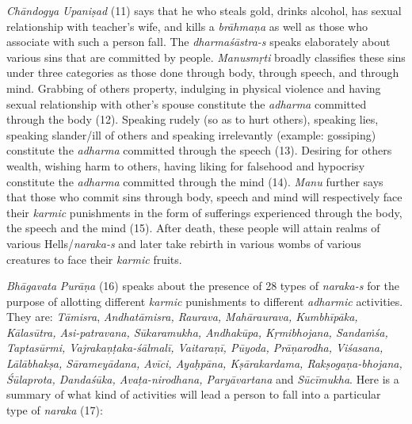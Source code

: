 \emph{Chāndogya} \emph{Upaniṣad} (11) says that he who steals gold, drinks alcohol, has sexual relationship with teacher's wife, and kills a \emph{brāhmaṇa} as well as those who associate with such a person fall. The \emph{dharmaśāstra-s} speaks elaborately about various sins that are committed by people. \emph{Manusmṛti} broadly classifies these sins under three categories as those done through body, through speech, and through mind. Grabbing of others property, indulging in physical violence and having sexual relationship with other's spouse constitute the \emph{adharma} committed through the body (12). Speaking rudely (so as to hurt others), speaking lies, speaking slander/ill of others and speaking irrelevantly (example: gossiping) constitute the \emph{adharma} committed through the speech (13). Desiring for others wealth, wishing harm to others, having liking for falsehood and hypocrisy constitute the \emph{adharma} committed through the mind (14). \emph{Manu} further says that those who commit sins through body, speech and mind will respectively face their \emph{karmic} punishments in the form of sufferings experienced through the body, the speech and the mind (15). After death, these people will attain realms of various Hells/\emph{naraka-s} and later take rebirth in various wombs of various creatures to face their \emph{karmic} fruits.

\emph{Bhāgavata} \emph{Purāṇa} (16) speaks about the presence of 28 types of \emph{naraka-s} for the purpose of allotting different \emph{karmic} punishments to different \emph{adharmic} activities. They are: \emph{Tāmisra}, \emph{Andhatāmisra, Raurava, Mahāraurava, Kumbhīpāka, Kālasūtra, Asi-patravana, Sūkaramukha, Andhakūpa, Kṛmibhojana, Sandaṁśa, Taptasūrmi, Vajrakaṇṭaka-śālmalī, Vaitaraṇī, Pūyoda, Prāṇarodha, Viśasana, Lālābhakṣa, Sārameyādana, Avīci, Ayaḥpāna, Kṣārakardama, Rakṣogaṇa-bhojana, Śūlaprota, Dandaśūka, Avaṭa-nirodhana, Paryāvartana} and \emph{Sūcīmukha}. Here is a summary of what kind of activities will lead a person to fall into a particular type of \emph{naraka} (17):

